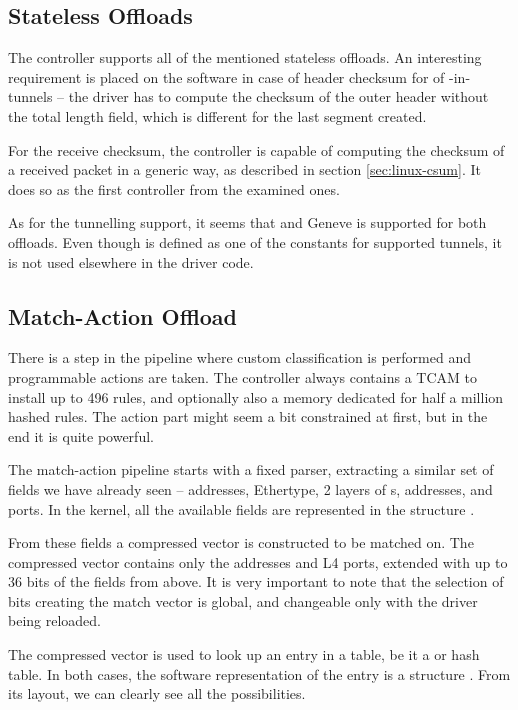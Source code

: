 \subsection{Stateless Offloads}

The controller supports all of the mentioned stateless offloads. An interesting
requirement is placed on the software in case of  header checksum for
 of -in- tunnels -- the driver has to compute the checksum
of the outer  header without the total length field, which is different
for the last segment created.

For the receive checksum, the controller is capable of computing the checksum
of a received packet in a generic way, as described in section
\ref{sec:linux-csum}. It does so as the first controller from the examined
ones.

As for the tunnelling support, it seems that  and Geneve is supported
for both offloads. Even though  is defined as one of the constants for
supported tunnels, it is not used elsewhere in the driver code.

\subsection{Match-Action Offload}

There is a step in the pipeline where custom classification is performed and
programmable actions are taken. The controller always contains a TCAM to
install up to 496 rules, and optionally also a memory dedicated for half
a million hashed rules. The action part might seem a bit constrained at first,
but in the end it is quite powerful.

The match-action pipeline starts with a fixed parser, extracting a similar set
of fields we have already seen --  addresses, Ethertype, 2 layers of
s,  addresses,  and  ports. In the kernel, all the
available fields are represented in the structure
.

From these fields a compressed vector is constructed to be matched on. The
compressed vector contains only the  addresses and L4 ports, extended with up
to 36 bits of the fields from above. It is very important to note that the
selection of bits creating the match vector is global, and changeable only with
the driver being reloaded.

The compressed vector is used to look up an entry in a table, be it a  or
hash table. In both cases, the software representation of the entry is a structure
.
From its layout, we can clearly see all the possibilities.

